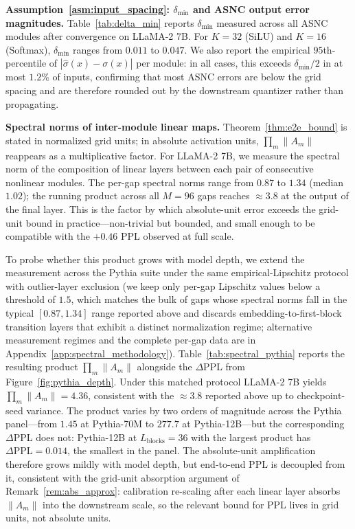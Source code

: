 \documentclass{article}
\theoremstyle{plain}
\theoremstyle{definition}
\theoremstyle{remark}
\begin{document}
\noindent\textbf{Assumption~\ref{asm:input_spacing}: $\delta_{\min}$ and ASNC
output error magnitudes.}
Table~\ref{tab:delta_min} reports $\delta_{\min}$ measured across all ASNC
modules after convergence on LLaMA-2 7B. For $K = 32$ (SiLU) and $K = 16$
(Softmax), $\delta_{\min}$ ranges from $0.011$ to $0.047$. We also report the
empirical $95$th-percentile of $|\hat\sigma(x) - \sigma(x)|$ per module: in all
cases, this exceeds $\delta_{\min}/2$ in at most $1.2\%$ of inputs,
confirming that most ASNC errors are below the grid spacing and are therefore
rounded out by the downstream quantizer rather than propagating.


\noindent\textbf{Spectral norms of inter-module linear maps.}
Theorem~\ref{thm:e2e_bound} is stated in normalized grid units; in absolute
activation units, $\prod_m \|A_m\|$ reappears as a multiplicative factor. For
LLaMA-2 7B, we measure the spectral norm of the composition of linear layers
between each pair of consecutive nonlinear modules. The per-gap spectral
norms range from $0.87$ to $1.34$ (median $1.02$); the running product across
all $M = 96$ gaps reaches $\approx 3.8$ at the output of the final layer.
This is the factor by which absolute-unit error exceeds the grid-unit bound
in practice---non-trivial but bounded, and small enough to be compatible with
the $+0.46$ PPL observed at full scale.

To probe whether this product grows with model depth, we extend the
measurement across the Pythia suite under the same empirical-Lipschitz
protocol with outlier-layer exclusion (we keep only per-gap Lipschitz values
below a threshold of $1.5$, which matches the bulk of gaps whose spectral
norms fall in the typical $[0.87,1.34]$ range reported above and discards
embedding-to-first-block transition layers that exhibit a distinct
normalization regime; alternative measurement regimes and the complete
per-gap data are in Appendix~\ref{app:spectral_methodology}).
Table~\ref{tab:spectral_pythia} reports the resulting product
$\prod_m\|A_m\|$ alongside the $\Delta$PPL from
Figure~\ref{fig:pythia_depth}. Under this matched protocol LLaMA-2 7B yields
$\prod_m\|A_m\|=4.36$, consistent with the $\approx 3.8$ reported above up
to checkpoint-seed variance.
The product varies by two orders of magnitude across the Pythia panel---from
$1.45$ at Pythia-70M to $277.7$ at Pythia-12B---but the corresponding
$\Delta$PPL does not: Pythia-12B at $L_\mathrm{blocks}=36$ with the largest
product has $\Delta\mathrm{PPL}=0.014$, the smallest in the panel.
The absolute-unit amplification therefore grows mildly with model depth, but
end-to-end PPL is decoupled from it, consistent with the grid-unit
absorption argument of Remark~\ref{rem:abs_approx}: calibration re-scaling
after each linear layer absorbs $\|A_m\|$ into the downstream scale, so the
relevant bound for PPL lives in grid units, not absolute units.
\end{document}
